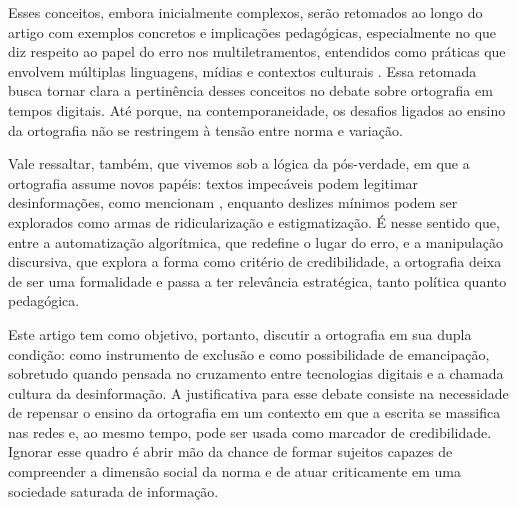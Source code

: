 \documentclass[portuguese]{textolivre}
\begin{document}
Esses conceitos, embora inicialmente complexos, serão retomados ao longo do artigo com exemplos concretos e implicações pedagógicas, especialmente no que diz respeito ao papel do erro nos multiletramentos, entendidos como práticas que envolvem múltiplas linguagens, mídias e contextos culturais \cite{newlondongroup1996multiliteracies,rojo2009letramentos,rojo2012multiletramentos}. Essa retomada busca tornar clara a pertinência desses conceitos no debate sobre ortografia em tempos digitais. Até porque, na contemporaneidade, os desafios ligados ao ensino da ortografia não se restringem à tensão entre norma e variação.

Vale ressaltar, também, que vivemos sob a lógica da pós-verdade, em que a ortografia assume novos papéis: textos impecáveis podem legitimar desinformações, como mencionam \textcite{fazio2015illusorytruth}, enquanto deslizes mínimos podem ser explorados como armas de ridicularização e estigmatização. É nesse sentido que, entre a automatização algorítmica, que redefine o lugar do erro, e a manipulação discursiva, que explora a forma como critério de credibilidade, a ortografia deixa de ser uma formalidade e passa a ter relevância estratégica, tanto política quanto pedagógica.

Este artigo tem como objetivo, portanto, discutir a ortografia em sua dupla condição: como instrumento de exclusão e como possibilidade de emancipação, sobretudo quando pensada no cruzamento entre tecnologias digitais e a chamada cultura da desinformação. A justificativa para esse debate consiste na necessidade de repensar o ensino da ortografia em um contexto em que a escrita se massifica nas redes e, ao mesmo tempo, pode ser usada como marcador de credibilidade. Ignorar esse quadro é abrir mão da chance de formar sujeitos capazes de compreender a dimensão social da norma e de atuar criticamente em uma sociedade saturada de informação.
\end{document}
